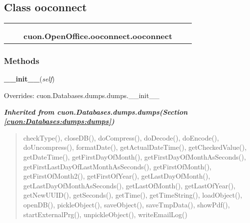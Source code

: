 \subsection{Class ooconnect}

    \label{cuon:OpenOffice:ooconnect:ooconnect}
\begin{tabular}{cccccc}
\multicolumn{2}{r}{\settowidth{\BCL}{cuon.Databases.dumps.dumps}\multirow{2}{\BCL}{cuon.Databases.dumps.dumps}}
&&
  \\\cline{3-3}
  &&\multicolumn{1}{c|}{}
&&
  \\
&&\multicolumn{2}{l}{\textbf{cuon.OpenOffice.ooconnect.ooconnect}}
\end{tabular}



  \subsubsection{Methods}

    \vspace{0.5ex}

\hspace{.8\funcindent}\begin{boxedminipage}{\funcwidth}

    \raggedright \textbf{\_\_init\_\_}(\textit{self})

\setlength{\parskip}{2ex}
\setlength{\parskip}{1ex}
      Overrides: cuon.Databases.dumps.dumps.\_\_init\_\_

    \end{boxedminipage}


\large{\textbf{\textit{Inherited from cuon.Databases.dumps.dumps\textit{(Section \ref{cuon:Databases:dumps:dumps})}}}}

\begin{quote}
checkType(), closeDB(), doCompress(), doDecode(), doEncode(), doUncompress(), formatDate(), getActualDateTime(), getCheckedValue(), getDateTime(), getFirstDayOfMonth(), getFirstDayOfMonthAsSeconds(), getFirstLastDayOfLastMonthAsSeconds(), getFirstOfMonth(), getFirstOfMonth2(), getFirstOfYear(), getLastDayOfMonth(), getLastDayOfMonthAsSeconds(), getLastOfMonth(), getLastOfYear(), getNewUUID(), getSeconds(), getTime(), getTimeString(), loadObject(), openDB(), pickleObject(), saveObject(), saveTmpData(), showPdf(), startExternalPrg(), unpickleObject(), writeEmailLog()
\end{quote}
